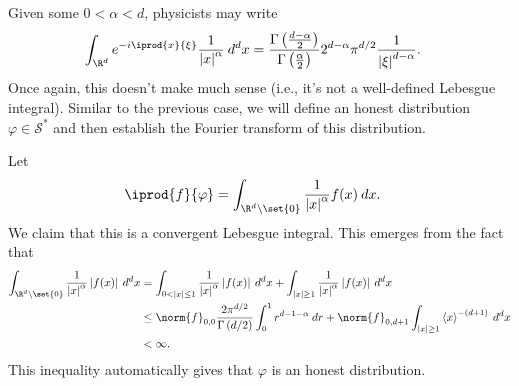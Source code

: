 \documentclass[10pt]{mypackage}
\begin{document}
\begin{example}
  Given some $0 < \alpha < d$, physicists may write
  \begin{align*}
    \int_{\R^d}^{} e^{-i \iprod{x}{\xi}} \frac{1}{\left\vert x \right\vert^{\alpha}}\:d^{d}x &= \frac{\Gamma\left( \frac{d-\alpha}{2} \right)}{\Gamma\left( \frac{\alpha}{2} \right)} 2^{d-\alpha}\pi^{d/2} \frac{1}{\left\vert \xi \right\vert^{d-\alpha}}.
  \end{align*}
  Once again, this doesn't make much sense (i.e., it's not a well-defined Lebesgue integral). Similar to the previous case, we will define an honest distribution $\varphi\in \mathcal{S}^{\ast}$ and then establish the Fourier transform of this distribution.

  Let
  \begin{align*}
    \iprod{f}{\varphi} &= \int_{\R^d\setminus \set{0}}^{} \frac{1}{\left\vert x \right\vert^{\alpha}}f(x)\:dx.
  \end{align*}
  We claim that this is a convergent Lebesgue integral. This emerges from the fact that
  \begin{align*}
\int_{\R^d\setminus \set{0}}^{} \frac{1}{\left\vert x \right\vert^{\alpha}}\left\vert f(x) \right\vert\:d^{d}x &= \int_{0< \left\vert x \right\vert \leq 1}^{} \frac{1}{\left\vert x \right\vert^{\alpha}}\left\vert f(x) \right\vert\:d^{d}x + \int_{\left\vert x \right\vert\geq 1}^{} \frac{1}{\left\vert x \right\vert^\alpha}\left\vert f(x) \right\vert\:d^{d}x\\
                     &\leq \norm{f}_{0,0}\frac{2\pi^{d/2}}{\Gamma\left( d/2 \right)} \int_{0}^{1} r^{d-1-\alpha}\:dr + \norm{f}_{0,d+1} \int_{\left\vert x \right\vert\geq 1}^{} \left\langle x \right\rangle^{-\left( d+1 \right)}\:d^{d}x\\
                     &< \infty.
  \end{align*}
  This inequality automatically gives that $\varphi$ is an honest distribution.


\end{example}
\end{document}
